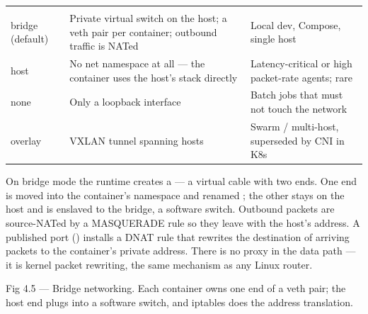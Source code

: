 \begin{center}\small
\wbrowcolors
\begin{tabularx}{\linewidth}{@{}L{20mm} X L{34mm}@{}}
 &  & \\
bridge (default) & Private virtual switch on the host; a veth pair per container; outbound traffic is NATed & Local dev, Compose, single host\\
host & No net namespace at all --- the container uses the host's stack directly & Latency-critical or high packet-rate agents; rare\\
none & Only a loopback interface & Batch jobs that must not touch the network\\
overlay & VXLAN tunnel spanning hosts & Swarm / multi-host, superseded by CNI in K8s\\
\end{tabularx}
\end{center}

 On bridge mode the runtime creates a  --- a virtual cable with two ends. One end is moved into the container's namespace and renamed ; the other stays on the host and is enslaved to the  bridge, a software switch. Outbound packets are source-NATed by a MASQUERADE rule so they leave with the host's address. A published port () installs a DNAT rule that rewrites the destination of arriving packets to the container's private address. There is no proxy in the data path --- it is kernel packet rewriting, the same mechanism as any Linux router.

\begin{wbfigure}{Fig 4.5 — Bridge networking. Each container owns one end of a veth pair; the host end plugs into a software switch, and iptables does the address translation.}
\end{wbfigure}

